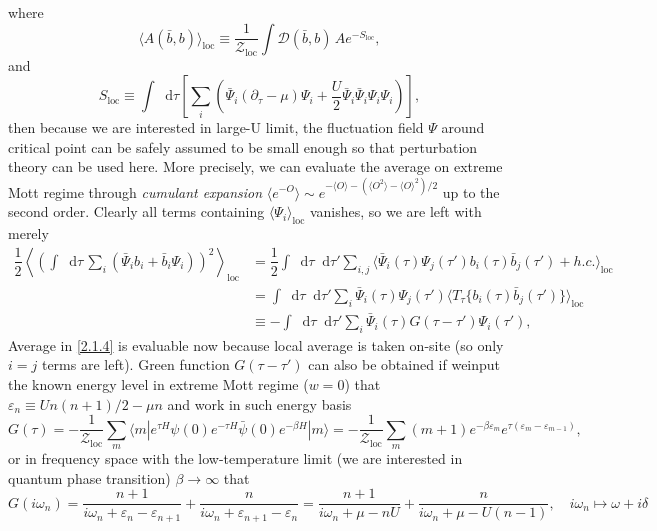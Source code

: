 \documentclass[10pt,nofootinbib]{revtex4}
\newcommand*\dd{\mathop{}\!\mathrm{d}}
\def\Z{\mathcal{Z}}
\numberwithin{equation}{section}
\begin{document}
		where
		\begin{equation*}
			\langle A(\bar{b},b)\rangle_{\text{loc}}\equiv\dfrac{1}{\Z_\text{loc}}\int\mathcal{D}(\bar{b},b)\, Ae^{-S_{\text{loc}}},
		\end{equation*}
		and
		\begin{equation}\label{2.1.3}
			S_{\text{loc}}\equiv\int\dd\tau\left[\sum_i \left(\bar{\Psi}_i(\partial_\tau-\mu)\Psi_i+\dfrac{U}{2}\bar{\Psi}_i\bar{\Psi}_i\Psi_i\Psi_i\right)\right],
		\end{equation}
		then because we are interested in large-U limit, the fluctuation field $\Psi$ around critical point can be safely assumed to be small enough so that perturbation theory can be used here. More precisely, we can evaluate the average on extreme Mott regime through \emph{cumulant expansion} $\langle e^{-O}\rangle\sim e^{-\langle O\rangle-(\langle O^2\rangle-\langle O\rangle^2)/2}$ up to the second order. Clearly all terms containing $\langle\Psi_i\rangle_{\text{loc}}$ vanishes, so we are left with merely
		\begin{align}
			\dfrac{1}{2}\left\langle\left(\int\dd\tau\,\sum_i(\bar{\Psi}_ib_i+\bar{b}_i\Psi_i)\right)^2\right\rangle_{\text{loc}}&=\dfrac{1}{2}\int\dd\tau\dd\tau'\sum_{i,j}\bigg\langle\bar{\Psi}_i(\tau)\Psi_j(\tau')b_i(\tau)\bar{b}_j(\tau')+h.c.\bigg\rangle_{\text{loc}}\nonumber\\
			&=\int\dd\tau\dd\tau'\sum_{i}\bar{\Psi}_i(\tau)\Psi_j(\tau')\langle T_\tau\{b_i(\tau)\bar{b}_j(\tau')\}\rangle_{\text{loc}}\nonumber\\
			&\equiv-\int\dd\tau\dd\tau'\sum_i\bar{\Psi}_i(\tau)G(\tau-\tau')\Psi_i(\tau'),\label{2.1.4}
		\end{align}
		Average in \eqref{2.1.4} is evaluable now because local average is taken on-site (so only $i=j$ terms are left). Green function $G(\tau-\tau')$ can also be obtained if weinput the known energy level in extreme Mott regime ($w=0$) that $\varepsilon_n\equiv Un(n+1)/2-\mu n$ and work in such energy basis
		\begin{equation}\label{2.1.5}
			G(\tau)=-\dfrac{1}{\Z_{\text{loc}}}\sum_{m}\langle m|e^{\tau H}\psi(0)e^{-\tau H}\bar{\psi}(0)e^{-\beta H}|m\rangle=-\dfrac{1}{\Z_{\text{loc}}}\sum_m (m+1)e^{-\beta \varepsilon_m}e^{\tau(\varepsilon_m- \varepsilon_{m-1})},
		\end{equation}
		or in frequency space with the low-temperature limit (we are interested in quantum phase transition) $\beta\rightarrow\infty$ that
		\begin{equation}\label{2.1.6}
			G(i\omega_n)=\dfrac{n+1}{i\omega_n+\varepsilon_n- \varepsilon_{n+1}}+\dfrac{n}{i\omega_n+ \varepsilon_{n+1}-\varepsilon_n}=\dfrac{n+1}{i\omega_n+\mu-nU}+\dfrac{n}{i\omega_n+\mu-U(n-1)},\quad i\omega_n\mapsto\omega+i\delta 
		\end{equation}
\end{document}
